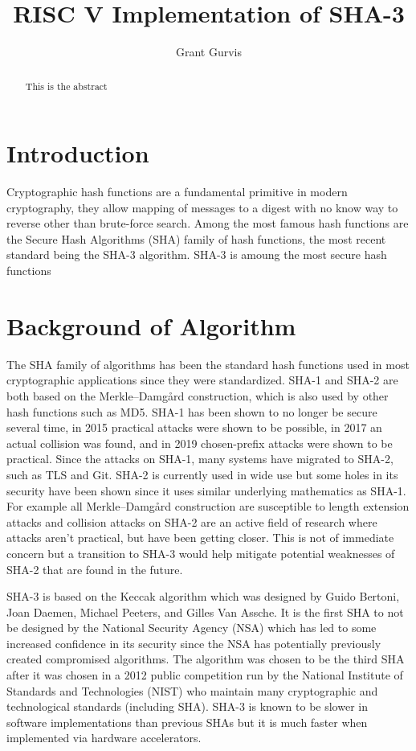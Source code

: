 \documentclass{IEEEtran}
\title{RISC V Implementation of SHA-3} \author{Grant Gurvis}
\begin{document}
\maketitle

\begin{abstract} This is the abstract \end{abstract}

\section{Introduction}

Cryptographic hash functions are a fundamental primitive in modern cryptography,
they allow mapping of messages to a digest with no know way to reverse other
than brute-force search. Among the most famous hash functions are the Secure
Hash Algorithms (SHA) family of hash functions, the most recent standard being
the SHA-3 algorithm. SHA-3 is amoung the most secure hash functions 

\section{Background of Algorithm} The SHA family of algorithms has been the
standard hash functions used in most cryptographic applications since they were
standardized. SHA-1 and SHA-2 are both based on the Merkle–Damgård construction,
which is also used by other hash functions such as MD5. SHA-1 has been shown to
no longer be secure several time, in 2015 practical attacks were shown to be
possible,\cite{fischlin_freestart_2016} in 2017 an actual collision was
found,\cite{stevens_first_2017} and in 2019 chosen-prefix attacks were shown to
be practical.\cite{ishai_collisions_2019} Since the attacks on SHA-1, many
systems have migrated to SHA-2, such as TLS and Git. SHA-2 is currently used in
wide use but some holes in its security have been shown since it uses similar
underlying mathematics as SHA-1. For example all Merkle–Damgård construction are
susceptible to length extension attacks and collision attacks on SHA-2 are an
active field of research where attacks aren't practical, but have been getting
closer. This is not of immediate concern but a transition to SHA-3 would help
mitigate potential weaknesses of SHA-2 that are found in the future.

SHA-3 is based on the Keccak algorithm which was designed by Guido Bertoni, Joan
Daemen,  Michael Peeters, and Gilles Van Assche. It is the first SHA to not be
designed by the National Security Agency (NSA) which has led to some increased
confidence in its security since the NSA has potentially previously created
compromised algorithms.\cite{perlroth_government_2013} The algorithm was chosen
to be the third SHA after it was chosen in a 2012 public competition run by the
National Institute of Standards and Technologies (NIST) who maintain many
cryptographic and technological standards (including SHA). SHA-3 is known to be
slower in software implementations than previous SHAs but it is much faster when
implemented via hardware accelerators. 
\end{document}
